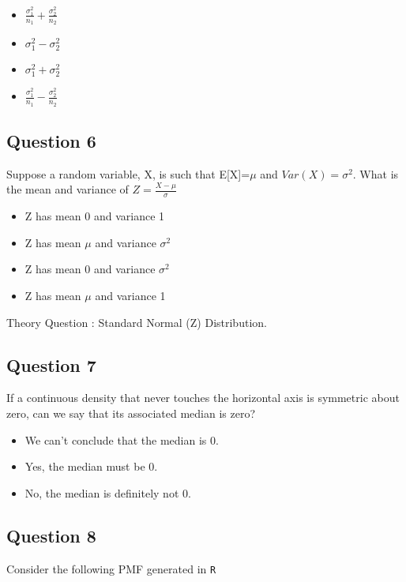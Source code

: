 \documentclass[]{article}
\begin{document}
\begin{itemize}
\item $\frac{\sigma^2_1}{n_1}+ \frac{\sigma^2_2}{n_2}$
\item $\sigma^2_1−\sigma^2_2$
\item $\sigma^2_1+\sigma^2_2$
\item $\frac{\sigma^2_1}{n_1}- \frac{\sigma^2_2}{n_2}$
\end{itemize}
\subsection{Question 6}
Suppose a random variable, X, is such that E[X]=$\mu$  and $Var(X)=\sigma^2$. 
What is the mean and variance of $Z= \frac{X−\mu}{\sigma}$

\begin{itemize}
\item Z has mean 0 and variance 1
\item Z has mean $\mu$ and variance $\sigma^2$
\item Z has mean 0 and variance $\sigma^2$
\item Z has mean $\mu$ and variance 1
\end{itemize}

Theory Question : Standard Normal (Z) Distribution.

\subsection{Question 7}
If a continuous density that never touches the horizontal axis is symmetric about zero, can we say that its associated median is zero?

\begin{itemize}
\item We can't conclude that the median is 0.
\item Yes, the median must be 0.
\item No, the median is definitely not 0.
\end{itemize}


\newpage
\large
\subsection*{Question 8}
Consider the following PMF generated in \texttt{R}
\end{document}
